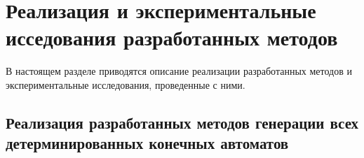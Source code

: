 


\section{Реализация и экспериментальные исседования разработанных методов}
\label{sec:findall:results}

В настоящем разделе приводятся описание реализации разработанных методов и экспериментальные исследования, проведенные с ними.


\subsection{Реализация разработанных методов генерации всех детерминированных конечных автоматов}
\label{sec:findall:results:impl}

